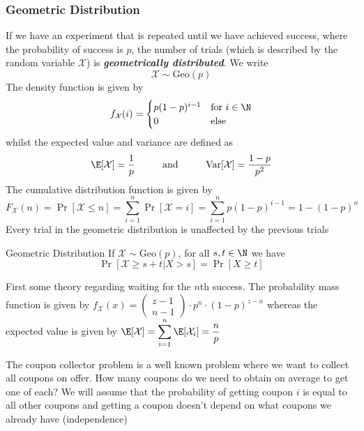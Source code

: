 \subsubsection{Geometric Distribution}
If we have an experiment that is repeated until we have achieved success, where the probability of success is $p$, the number of trials (which is described by the random variable $\mathcal{X}$) is \textbf{\textit{geometrically distributed}}. We write
\[
    \mathcal{X} \sim \text{Geo}(p)
\]
The density function is given by
\[
    f_{\mathcal{X}}(i) = \begin{cases}
        p(1 - p)^{i - 1} & \text{for } i \in \N \\
        0                & \text{else}
    \end{cases}
\]
whilst the expected value and variance are defined as
\[
    \E[\mathcal{X}] = \frac{1}{p} \hspace{1cm} \text{and} \hspace{1cm} \text{Var}[\mathcal{X}] = \frac{1 - p}{p^2}
\]
The cumulative distribution function is given by
\[
    F_{\mathcal{X}}(n) = \Pr[\mathcal{X} \leq n] = \sum_{i = 1}^{n} \Pr[\mathcal{X} = i] = \sum_{i = 1}^{n} p(1 - p)^{i - 1} = 1 - (1 - p)^n
\]
 Every trial in the geometric distribution is unaffected by the previous trials
\setcounter{all}{45}
\begin{theorem}[]{Geometric Distribution}
    If $\mathcal{X} \sim \text{Geo}(p)$, for all $s, t \in \N$ we have
    \[
        \Pr[\mathcal{X} \geq s + t | X > s] = \Pr[X \geq t]
    \]
\end{theorem}

\newpage
{}

First some theory regarding waiting for the $n$th success. The probability mass function is given by $f_{\mathcal{X}}(x) = \begin{pmatrix}z - 1\\ n - 1\end{pmatrix} \cdot p^n \cdot (1- p)^{z - n}$ whereas the expected value is given by $\displaystyle\E[\mathcal{X}] = \sum_{i = 1}^{n} \E[\mathcal{X}_i] = \frac{n}{p}$

The coupon collector problem is a well known problem where we want to collect all coupons on offer. How many coupons do we need to obtain on average to get one of each? We will assume that the probability of getting coupon $i$ is equal to all other coupons and getting a coupon doesn't depend on what coupons we already have (independence)

